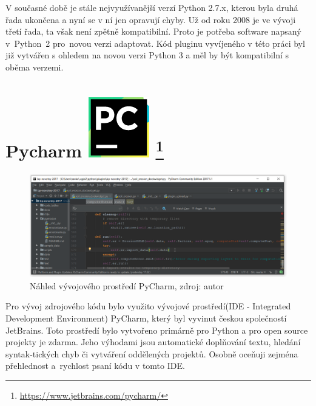 V současné době je stále nejvyužívanější verzí Python 2.7.x, kterou
byla druhá řada ukončena a nyní se v ní jen opravují chyby. Už od roku
2008 je ve vývoji třetí řada, ta však není zpětně kompatibilní. Proto
je potřeba software napsaný v~Python~2 pro~novou verzi adaptovat. Kód 
pluginu vyvíjeného v této práci byl již vytvářen s ohledem na novou 
verzi Python 3 a měl by být kompatibilní s oběma verzemi.
\cite{diveIntoPython}\cite{learningPython}

\section[PyCharm]{Pycharm \includegraphics[scale=0.2]
{./pictures/pycharm.png} \footnote{\url{https://www.jetbrains.com/pycharm/}}}
\label{pycharm}
\vspace{-10pt}
\begin{figure}[H]
    \centering \includegraphics[scale=0.45]{./pictures/pycharm_screen.png}
      \caption[Náhled vývojového prostředí PyCharm]{Náhled vývojového 
      prostředí PyCharm, zdroj: autor}
      \label{screen:pycharm}
\end{figure}
\vspace{-10pt}
Pro vývoj zdrojového kódu bylo využito vývojové prostředí(IDE - 
Integrated Development Environment)  PyCharm, který byl vyvinut 
českou společností JetBrains. Toto prostředí bylo vytvořeno primárně 
pro Python a pro open source projekty je zdarma. Jeho výhodami jsou 
automatické doplňování textu, hledání syntak-tických chyb či vytváření 
oddělených projektů. Osobně oceňuji zejména přehlednost a~rychlost 
psaní kódu v tomto IDE.\cite{masteringPycharm}
